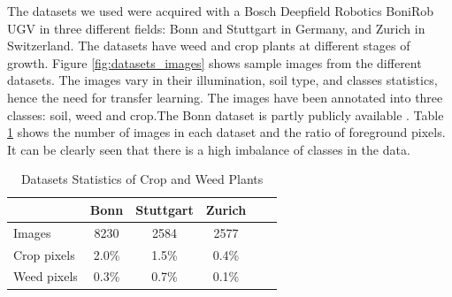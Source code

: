 \documentclass[letterpaper, 10 pt, conference]{ieeeconf}  %
\begin{document}
The datasets we used were acquired with a Bosch Deepfield Robotics BoniRob UGV in three different fields: Bonn and Stuttgart in Germany, and Zurich in Switzerland. The datasets have weed and crop plants at different stages of growth. Figure \ref{fig:datasets_images} shows sample images from the different datasets. The images vary in their illumination, soil type, and classes statistics, hence the need for transfer learning. The images have been annotated into three classes: soil, weed and crop.The Bonn dataset is partly publicly available \cite{chebrolu2017agricultural}. Table \ref{tab:datasets_stats} shows the number of images in each dataset and the ratio of foreground pixels. It can be clearly seen that there is a high imbalance of classes in the data.



    \begin{table}
        \centering
        \caption{Datasets Statistics of Crop and Weed Plants}
        \begin{tabular}{@{}lccccc@{}} 
            \toprule
              & Bonn & Stuttgart & Zurich \\ 
            \midrule 
    		  Images  & 8230 & 2584 & 2577 \\ \addlinespace
    		  Crop pixels & 2.0\% & 1.5\% & 0.4\%  \\ \addlinespace
    		  Weed pixels & 0.3\% & 0.7\% & 0.1\%  \\    
            \bottomrule
        \end{tabular}
        \label{tab:datasets_stats}
    \end{table}
    
    
    
\end{document}
